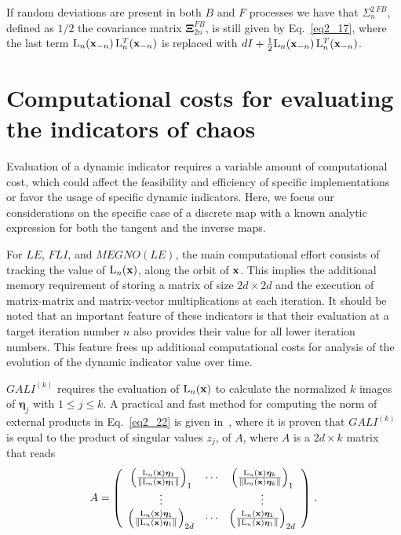 \begin{chapterappendices}{}
If random deviations are present in both $B$ and $F$ processes we
have that  $\Sigma^{2\,FB}_{n} $,  defined  as $1/2$ the covariance matrix $\boldsymbol{\Xi}^{FB}_{2n}$,
is still given by Eq.~\eqref{eq2_17}, where the last term $\mathrm{L}_{n}(\vb{x}_{-n})\, \mathrm{L}_{n}^T(\vb{x}_{-n})$
is replaced with $dI+\frac{1}{ 2}\mathrm{L}_{n}(\vb{x}_{-n})\, \mathrm{L}_{n}^T(\vb{x}_{-n})$.
%
\section{Computational costs for evaluating the indicators of chaos}
%
Evaluation of a dynamic indicator requires a variable amount of computational cost, which could affect the feasibility and efficiency of specific implementations or favor the usage of specific dynamic indicators. Here, we focus our considerations on the specific case of a discrete map with a known analytic expression for both the tangent and the inverse maps.

For $LE$, $FLI$, and $MEGNO(LE)$, the main computational effort consists of tracking the value of $\mathrm{L}_n(\vb{x})$, along the orbit of $\vb{x}$. This implies the additional memory requirement of storing a matrix of size $2d\times2d$ and the execution of matrix-matrix and matrix-vector multiplications at each iteration. It should be noted that an important feature of these indicators is that their evaluation at a target iteration number $n$ also provides their value for all lower iteration numbers. This feature frees up additional computational costs for analysis of the evolution of the dynamic indicator value over time.

$GALI^{(k)}$ requires the evaluation of $\mathrm{L}_n(\vb{x})$ to calculate the normalized $k$ images of $\boldsymbol{\eta}_j$ with $1\leq j \leq k$. A practical and fast method for computing the norm of external products in Eq.~\eqref{eq2_22} is given in~\cite{Skokos2008}, where it is proven that $GALI^{(k)}$ is equal to the product of singular values $z_j$, of $A$, where $A$ is a $2d\times k$ matrix that reads
\begin{equation}
    A = \left(\begin{array}{ccc}
        \left(\frac{\mathrm{L}_n(\vb{x}) \boldsymbol{\eta}_1}{ \Vert \mathrm{L}_n(\vb{x}) \boldsymbol{\eta}_1\Vert}\right)_1 & \cdots & \left(\frac{\mathrm{L}_n(\vb{x}) \boldsymbol{\eta}_k}{ \Vert \mathrm{L}_n(\vb{x}) \boldsymbol{\eta}_k\Vert}\right)_1 \\
        \vdots &  & \vdots \\
        \left(\frac{\mathrm{L}_n(\vb{x}) \boldsymbol{\eta}_1}{ \Vert \mathrm{L}_n(\vb{x}) \boldsymbol{\eta}_1\Vert}\right)_{2d} & \cdots & \left(\frac{\mathrm{L}_n(\vb{x}) \boldsymbol{\eta}_1}{ \Vert \mathrm{L}_n(\vb{x}) \boldsymbol{\eta}_1\Vert}\right)_{2d}
    \end{array}\right)\,.
\end{equation}


\end{chapterappendices}
